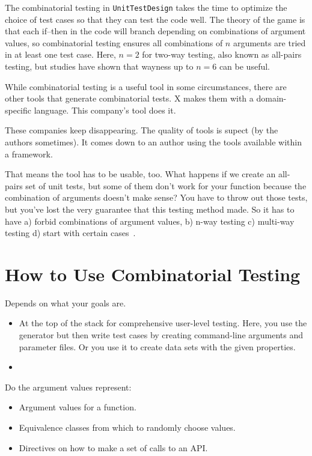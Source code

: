 \documentclass{juliacon}
\newcommand{\utd}{\texttt{UnitTestDesign}\xspace}
\begin{document}
\vskip 6pt
The combinatorial testing in \utd takes the time to optimize the choice of test cases so that they can test the code well. The theory of the game is that each if--then in the code will branch depending on combinations of argument values, so combinatorial testing ensures all combinations of $n$ arguments are tried in at least one test case. Here, $n=2$ for two-way testing, also known as all-pairs testing, but studies have shown that wayness up to $n=6$ can be useful.


\vskip 6pt
While combinatorial testing is a useful tool in some circumstances, there are other tools that generate combinatorial tests. X makes them with a domain-specific language. This company's tool does it.

\vskip 6pt
These companies keep disappearing. The quality of tools is supect (by the authors sometimes). It comes down to an author using the tools available within a framework.

\vskip 6pt
That means the tool has to be usable, too. What happens if we create an all-pairs set of unit tests, but some of them don't work for your function because the combination of arguments doesn't make sense? You have to throw out those tests, but you've lost the very guarantee that this testing method made.
So it has to have a) forbid combinations of argument values, b) n-way testing c) multi-way testing d) start with certain cases~\cite{Czerwonka2006-hm}.


\section{How to Use Combinatorial Testing}

Depends on what your goals are.
\begin{itemize}
   \item At the top of the stack for comprehensive user-level testing. Here, you use the generator but then write test cases by creating command-line arguments and parameter files. Or you use it to create data sets with the given properties.
   \item 
   \end{itemize}
Do the argument values represent:
\begin{itemize}
   \item Argument values for a function.
   \item Equivalence classes from which to randomly choose values.
   \item Directives on how to make a set of calls to an API.
   \end{itemize}
\end{document}
